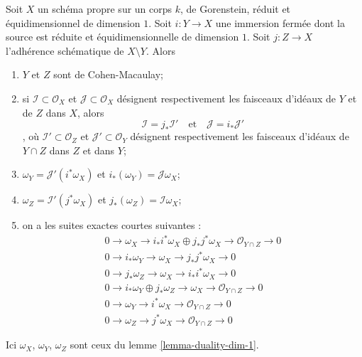 \begin{lemma}
\label{lemma-closed-subscheme-reduced-gorenstein}
Soit $X$ un schéma propre sur un corps $k$, de Gorenstein, réduit et équidimensionnel de dimension $1$. Soit $i : Y \to X$ une immersion fermée dont la source est réduite et équidimensionnelle de dimension $1$. Soit $j : Z \to X$ l'adhérence schématique de $X \setminus Y$. Alors \begin{enumerate} \item $Y$ et $Z$ sont de Cohen-Macaulay; \item si $\mathcal{I} \subset \mathcal{O}_X$ et $\mathcal{J} \subset \mathcal{O}_X$ désignent respectivement les faisceaux d'idéaux de $Y$ et de $Z$ dans $X$, alors $$
\mathcal{I} = j_*\mathcal{I}'
\quad\text{et}\quad
\mathcal{J} = i_*\mathcal{J}'
$$, où $\mathcal{I}' \subset \mathcal{O}_Z$ et $\mathcal{J}' \subset \mathcal{O}_Y$ désignent respectivement les faisceaux d'idéaux de $Y \cap Z$ dans $Z$ et dans $Y$; \item $\omega_Y = \mathcal{J}'(i^*\omega_X)$ et $i_*(\omega_Y) = \mathcal{J}\omega_X$; \item $\omega_Z = \mathcal{I}'(j^*\omega_X)$ et $j_*(\omega_Z) = \mathcal{I}\omega_X$; \item on a les suites exactes courtes suivantes : \begin{align*}
0 \to \omega_X \to i_*i^*\omega_X \oplus j_*j^*\omega_X \to
\mathcal{O}_{Y \cap Z} \to 0 \\
0 \to i_*\omega_Y \to \omega_X \to j_*j^*\omega_X \to 0 \\
0 \to j_*\omega_Z \to \omega_X \to i_*i^*\omega_X \to 0 \\
0 \to i_*\omega_Y \oplus j_*\omega_Z \to \omega_X \to
\mathcal{O}_{Y \cap Z} \to 0 \\
0 \to \omega_Y \to i^*\omega_X \to \mathcal{O}_{Y \cap Z} \to 0 \\
0 \to \omega_Z \to j^*\omega_X \to \mathcal{O}_{Y \cap Z} \to 0
\end{align*} \end{enumerate} Ici $\omega_X$, $\omega_Y$, $\omega_Z$ sont ceux du lemme \ref{lemma-duality-dim-1}.
\end{lemma}

